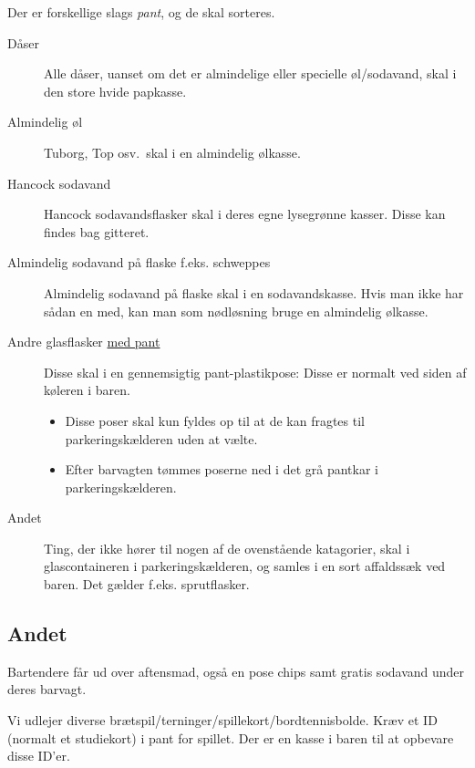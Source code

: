 Der er forskellige slags \textit{pant}, og de skal sorteres.
\begin{description}
\item[Dåser] Alle dåser, uanset om det er almindelige eller specielle
  øl/sodavand, skal i den store hvide papkasse.
\item[Almindelig øl] Tuborg, Top osv.\ skal i en almindelig ølkasse.
\item[Hancock sodavand] Hancock sodavandsflasker skal i deres egne lysegrønne kasser. Disse kan findes bag gitteret.
\item[Almindelig sodavand på flaske f.eks. schweppes] Almindelig sodavand på flaske skal i en
  sodavandskasse. Hvis man ikke har sådan en med, kan man som
  nødløsning bruge en almindelig ølkasse.%
\item[Andre glasflasker \underline{med pant}] Disse skal i en gennemsigtig
  pant-plastikpose: Disse er normalt ved siden af køleren i baren.
  \begin{itemize}
    \item Disse poser skal kun fyldes op til at de kan fragtes til parkeringskælderen uden at vælte.
    \item Efter barvagten tømmes poserne ned i det grå pantkar i parkeringskælderen.
  \end{itemize}
\item[Andet] Ting, der ikke hører til nogen af de ovenstående
  katagorier, skal i glascontaineren i parkeringskælderen,
  og samles i en sort affaldssæk ved baren. Det gælder f.eks. sprutflasker.
\end{description}

\subsection{Andet}
\label{sec:intra:andet}

Bartendere får ud over aftensmad, også en pose chips samt gratis
sodavand under deres barvagt.

Vi udlejer diverse
brætspil/terninger/spillekort/bordtennisbolde. Kræv et ID (normalt et
studiekort) i pant for spillet. Der er en kasse i baren til at
opbevare disse ID'er.

